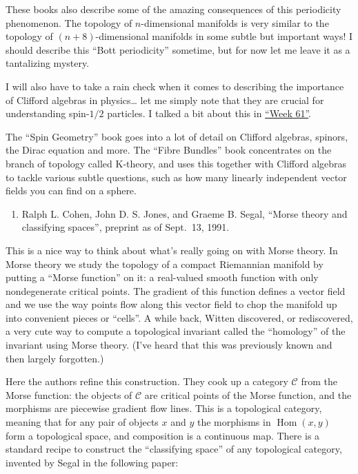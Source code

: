 \documentclass{article}
\def\tightlist{}
\begin{document}
These books also describe some of the amazing consequences of this
periodicity phenomenon. The topology of \(n\)-dimensional manifolds is
very similar to the topology of \((n+8)\)-dimensional manifolds in some
subtle but important ways! I should describe this ``Bott periodicity''
sometime, but for now let me leave it as a tantalizing mystery.

I will also have to take a rain check when it comes to describing the
importance of Clifford algebras in physics\ldots{} let me simply note
that they are crucial for understanding spin-\(1/2\) particles. I talked
a bit about this in \protect\hyperlink{week61}{``Week 61''}.

The ``Spin Geometry'' book goes into a lot of detail on Clifford
algebras, spinors, the Dirac equation and more. The ``Fibre Bundles''
book concentrates on the branch of topology called K-theory, and uses
this together with Clifford algebras to tackle various subtle questions,
such as how many linearly independent vector fields you can find on a
sphere.

\begin{enumerate}
\def\labelenumi{\arabic{enumi})}
\setcounter{enumi}{3}
\tightlist
\item
  Ralph L. Cohen, John D. S. Jones, and Graeme B. Segal, ``Morse theory
  and classifying spaces'', preprint as of Sept.~13, 1991.
\end{enumerate}

This is a nice way to think about what's really going on with Morse
theory. In Morse theory we study the topology of a compact Riemannian
manifold by putting a ``Morse function'' on it: a real-valued smooth
function with only nondegenerate critical points. The gradient of this
function defines a vector field and we use the way points flow along
this vector field to chop the manifold up into convenient pieces or
``cells''. A while back, Witten discovered, or rediscovered, a very cute
way to compute a topological invariant called the ``homology'' of the
invariant using Morse theory. (I've heard that this was previously known
and then largely forgotten.)

Here the authors refine this construction. They cook up a category
\(\mathcal{C}\) from the Morse function: the objects of \(\mathcal{C}\)
are critical points of the Morse function, and the morphisms are
piecewise gradient flow lines. This is a topological category, meaning
that for any pair of objects \(x\) and \(y\) the morphisms in
\(\operatorname{Hom}(x,y)\) form a topological space, and composition is
a continuous map. There is a standard recipe to construct the
``classifying space'' of any topological category, invented by Segal in
the following paper:
\end{document}
